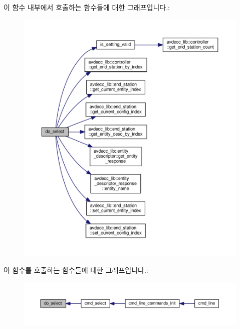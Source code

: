 이 함수 내부에서 호출하는 함수들에 대한 그래프입니다.\+:
\nopagebreak
\begin{figure}[H]
\begin{center}
\leavevmode
\includegraphics[width=350pt]{classcmd__line_aa893bad7b6999576e8d4c99ea70c585b_cgraph}
\end{center}
\end{figure}




이 함수를 호출하는 함수들에 대한 그래프입니다.\+:
\nopagebreak
\begin{figure}[H]
\begin{center}
\leavevmode
\includegraphics[width=350pt]{classcmd__line_aa893bad7b6999576e8d4c99ea70c585b_icgraph}
\end{center}
\end{figure}


